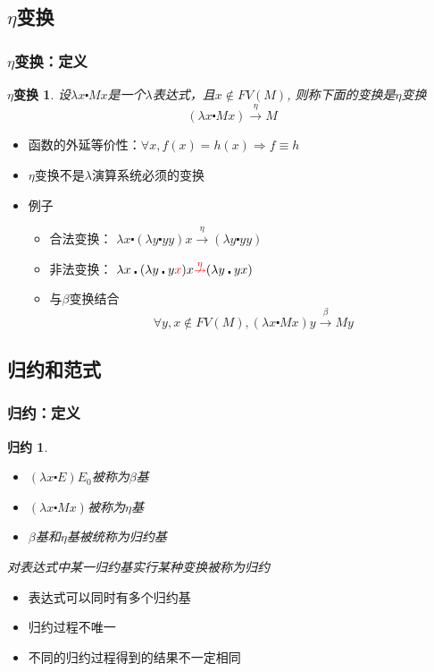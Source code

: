 \documentclass[CJKutf8,compress,hyperref]{beamer}
\begin{document}
\begin{CJK}{UTF8}{song}
\subsection{ $\eta$变换}
\begin{frame}
  \frametitle{$\eta$变换：定义} 
  \newtheorem{etaRed}{$\eta$变换} 
  \begin{etaRed}
    设$\lambda x \centerdot Mx$是一个$\lambda$表达式，且$x \not \in FV(M)$, 则称下面的变换是{\color{red}$\eta$变换}
    \begin{displaymath}
      (\lambda x \centerdot Mx) \stackrel{\eta}{\longrightarrow} M 
    \end{displaymath} 
  \end{etaRed}
  \begin{itemize}
  \item 函数的外延等价性：$\forall x, f(x) = h(x) \Longrightarrow f \equiv h$  
  \item $\eta$变换不是$\lambda$演算系统必须的变换 
  \item 例子 
    \begin{itemize}
    \item{合法变换：} $\lambda x \centerdot (\lambda y \centerdot yy) x \stackrel{\eta}{\longrightarrow}(\lambda y \centerdot yy)$ 
    \item{非法变换：}  $\lambda x \centerdot (\lambda y \centerdot y{\color{red}x}) x {\color{red}\stackrel{\eta}{\nrightarrow}} (\lambda y \centerdot yx) $
    \item 与$\beta$变换结合
      \begin{displaymath}
        \forall y, x \not \in FV(M), (\lambda x \centerdot Mx)y \stackrel{\beta}{\longrightarrow} My
      \end{displaymath}
    \end{itemize}
  \end{itemize}
\end{frame} 

\subsection{ 归约和范式}
\begin{frame}
  \frametitle{归约：定义} 
  \newtheorem{reduction}{归约} 
  \begin{reduction} 
    \begin{itemize}
    \item $(\lambda x \centerdot E)E_0$被称为$\beta$基
    \item $(\lambda x \centerdot Mx)$被称为$\eta$基
    \item $\beta$基和$\eta$基被统称为归约基 
    \end{itemize} 
    对表达式中某一归约基实行某种变换被称为{\color{red}归约}
  \end{reduction} 
  \begin{itemize}
  \item 表达式可以同时有多个归约基 
  \item 归约过程不唯一
  \item {\color{red}不同的归约过程得到的结果不一定相同}
  \end{itemize}
\end{frame} 


\end{CJK}
\end{document}
